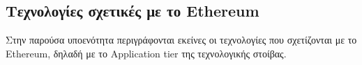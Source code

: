 \subsection{Τεχνολογίες σχετικές με το Ethereum} \label{subsection:4-3-3-ethereum-technologies}

Στην παρούσα υποενότητα περιγράφονται εκείνες οι τεχνολογίες που σχετίζονται με το Ethereum, δηλαδή με το Application tier της τεχνολογικής στοίβας.



